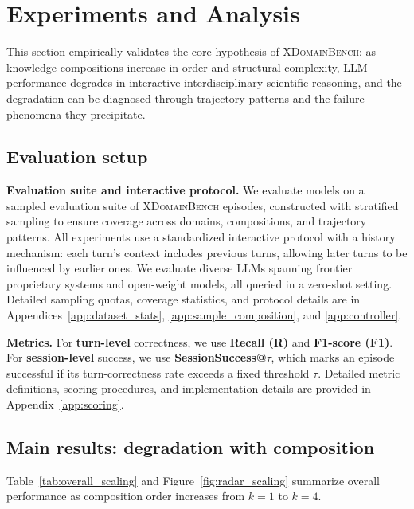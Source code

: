 \section{Experiments and Analysis}
\label{sec:experiments}
This section empirically validates the core hypothesis of \textsc{XDomainBench}: as knowledge compositions increase in order and structural complexity, LLM performance degrades in interactive interdisciplinary scientific reasoning, and the degradation can be diagnosed through trajectory patterns and the failure phenomena they precipitate.

\subsection{Evaluation setup}
\label{sec:exp_setup}

\textbf{Evaluation suite and interactive protocol.}
We evaluate models on a sampled evaluation suite of \textsc{XDomainBench} episodes, constructed with stratified sampling to ensure coverage across domains, compositions, and trajectory patterns.
All experiments use a standardized interactive protocol with a history mechanism: each turn's context includes previous turns, allowing later turns to be influenced by earlier ones.
We evaluate diverse LLMs spanning frontier proprietary systems and open-weight models, all queried in a zero-shot setting.
Detailed sampling quotas, coverage statistics, and protocol details are in Appendices~\ref{app:dataset_stats}, \ref{app:sample_composition}, and \ref{app:controller}.

\textbf{Metrics.}
For \textbf{turn-level} correctness, we use \textbf{Recall (R)} and \textbf{F1-score (F1)}.
For \textbf{session-level} success, we use \textbf{SessionSuccess@$\tau$}, which marks an episode successful if its turn-correctness rate exceeds a fixed threshold $\tau$.
Detailed metric definitions, scoring procedures, and implementation details are provided in Appendix~\ref{app:scoring}.

\subsection{Main results: degradation with composition}
\label{sec:main_results}

Table~\ref{tab:overall_scaling} and Figure~\ref{fig:radar_scaling} summarize overall performance as composition order increases from $k=1$ to $k=4$.

